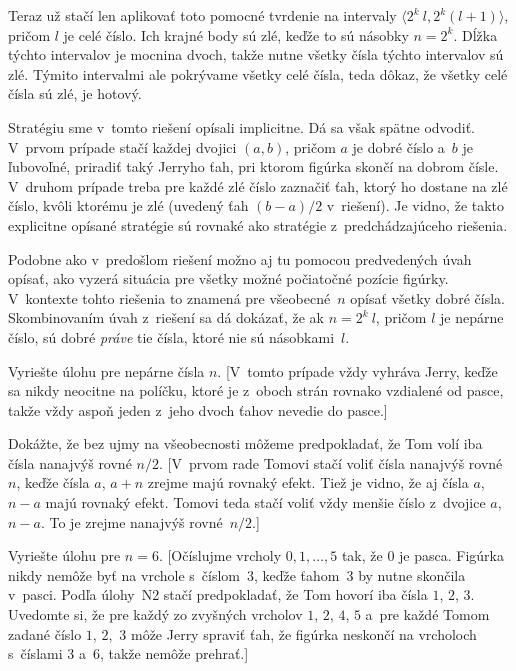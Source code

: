 {Teraz už stačí len aplikovať toto pomocné tvrdenie na intervaly
${\langle 2^k~l, 2^k(l+1) \rangle}$, pričom $l$ je celé
číslo. Ich krajné body sú zlé, keďže to sú násobky $n = 2^k$.
Dĺžka týchto intervalov je mocnina dvoch, takže nutne všetky
čísla týchto intervalov sú zlé. Týmito intervalmi ale pokrývame
všetky celé čísla, teda dôkaz, že všetky celé čísla sú zlé, je hotový.

\poznamka
Stratégiu sme v~tomto riešení
opísali implicitne. Dá sa však spätne odvodiť. V~prvom prípade
stačí každej dvojici $(a, b)$, pričom $a$ je dobré číslo a~$b$ je
ľubovoľné, priradiť taký Jerryho ťah, pri ktorom figúrka
skončí na dobrom čísle. V~druhom prípade treba pre každé
zlé číslo zaznačiť ťah, ktorý ho dostane na zlé číslo, kvôli
ktorému je zlé (uvedený ťah $(b-a) / 2$ v~riešení). Je
vidno, že takto explicitne opísané stratégie sú rovnaké ako
stratégie z~predchádzajúceho riešenia.

\poznamka
Podobne ako v~predošlom riešení
možno aj tu pomocou predvedených úvah opísať, ako vyzerá situácia
pre všetky možné počiatočné pozície figúrky. V~kontexte tohto
riešenia to znamená pre všeobecné~$n$ opísať všetky dobré
čísla. Skombinovaním úvah z~riešení sa dá dokázať, že ak
$n = 2^k~l$, pričom $l$ je nepárne číslo, sú dobré
{\it práve\/} tie čísla, ktoré nie sú násobkami~$l$.



Vyriešte úlohu pre nepárne čísla $n$. [V~tomto
prípade vždy vyhráva Jerry, keďže sa nikdy neocitne na políčku,
ktoré je z~oboch strán rovnako vzdialené od pasce, takže vždy aspoň
jeden z~jeho dvoch ťahov nevedie do pasce.]

Dokážte, že bez ujmy na všeobecnosti môžeme
predpokladať, že Tom volí iba čísla nanajvýš rovné $n / 2$.
[V~prvom rade Tomovi stačí voliť čísla nanajvýš rovné~$n$,
keďže čísla $a$, $a+n$ zrejme majú rovnaký efekt. Tiež je
vidno, že aj čísla $a$, $n-a$ majú rovnaký efekt. Tomovi teda
stačí voliť vždy menšie číslo z~dvojice $a$, $n-a$. To
je zrejme nanajvýš rovné~$n / 2$.]

Vyriešte úlohu pre $n = 6$. [Očíslujme vrcholy
$0, 1, \ldots, 5$ tak, že $0$ je pasca. Figúrka nikdy
nemôže byť na vrchole s~číslom~3, keďže ťahom~3 by nutne
skončila v~pasci. Podľa úlohy~N2 stačí predpokladať, že
Tom hovorí iba čísla $1$, $2$, $3$. Uvedomte si, že pre každý
zo zvyšných vrcholov $1$, $2$, $4$, $5$ a~pre každé Tomom zadané číslo
$1$, $2$,~$3$ môže Jerry spraviť ťah, že figúrka neskončí na vrcholoch
s~číslami 3 a~6, takže nemôže prehrať.]

}
